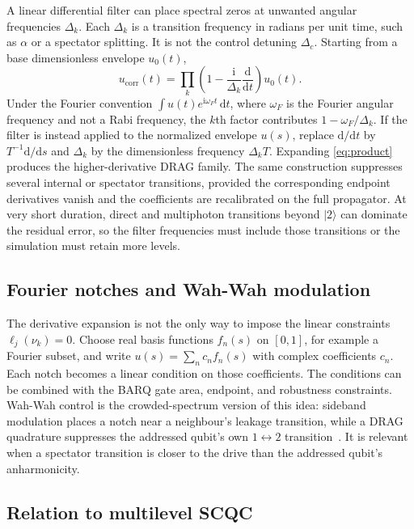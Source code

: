 \documentclass[11pt,a4paper]{article}
\theoremstyle{definition}
\newcommand{\ket}[1]{\lvert #1\rangle}
\newcommand{\dd}{\mathrm{d}}
\newcommand{\ii}{\mathrm{i}}
\begin{document}
A linear differential filter can place spectral zeros at unwanted angular
frequencies \(\Delta_k\).  Each \(\Delta_k\) is a transition frequency in
radians per unit time, such as \(\alpha\) or a spectator splitting.  It is not
the control detuning \(\Delta_c\).  Starting from a base dimensionless envelope
\(u_0(t)\),
\begin{equation}
\label{eq:product}
  u_{\mathrm{corr}}(t)
  =\prod_k\left(1-\frac{\ii}{\Delta_k}\frac{\dd}{\dd t}\right)u_0(t).
\end{equation}
Under the Fourier convention \(\int u(t)e^{\ii\omega_F t}\,\dd t\), where
\(\omega_F\) is the Fourier angular frequency and not a Rabi frequency, the
\(k\)th factor contributes \(1-\omega_F/\Delta_k\).  If the filter is instead
applied to the normalized envelope \(u(s)\), replace \(\dd/\dd t\) by
\(T^{-1}\dd/\dd s\) and \(\Delta_k\) by the dimensionless frequency
\(\Delta_k T\).  Expanding
\eqref{eq:product} produces the
higher-derivative DRAG family.  The same construction suppresses several
internal or spectator transitions, provided the corresponding endpoint
derivatives vanish and the coefficients are recalibrated on the full
propagator.  At very short duration, direct and multiphoton transitions beyond
\(\ket2\) can dominate the residual error, so the filter frequencies must
include those transitions or the simulation must retain more levels.

\subsection{Fourier notches and Wah-Wah modulation}

The derivative expansion is not the only way to impose the linear constraints
\(\ell_j(\nu_k)=0\).  Choose real basis functions \(f_n(s)\) on \([0,1]\), for
example a Fourier subset, and write \(u(s)=\sum_n c_n f_n(s)\) with complex
coefficients \(c_n\).  Each notch becomes a linear condition on those
coefficients.  The conditions can be combined with the BARQ gate
area, endpoint, and robustness constraints.  Wah-Wah control is the
crowded-spectrum version of this idea: sideband modulation places a notch near
a neighbour's leakage transition, while a DRAG quadrature suppresses the
addressed qubit's own \(1\leftrightarrow2\)
transition~\cite{Schutjens2013,Vesterinen2014}.  It is relevant when a
spectator transition is closer to the drive than the addressed qubit's
anharmonicity.

\subsection{Relation to multilevel SCQC}
\end{document}

